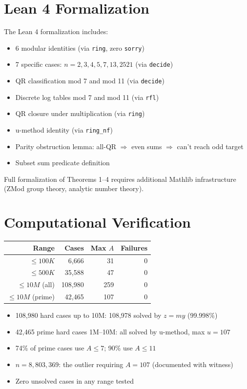 \documentclass[11pt]{article}
\theoremstyle{remark}
\begin{document}
\section{Lean 4 Formalization}

The Lean 4 formalization includes:
\begin{itemize}
\item 6 modular identities (via \texttt{ring}, zero \texttt{sorry})
\item 7 specific cases: $n = 2, 3, 4, 5, 7, 13, 2521$ (via \texttt{decide})
\item QR classification mod 7 and mod 11 (via \texttt{decide})
\item Discrete log tables mod 7 and mod 11 (via \texttt{rfl})
\item QR closure under multiplication (via \texttt{ring})
\item u-method identity (via \texttt{ring\_nf})
\item Parity obstruction lemma: all-QR $\Rightarrow$ even sums $\Rightarrow$ can't reach odd target
\item Subset sum predicate definition
\end{itemize}

Full formalization of Theorems 1--4 requires additional Mathlib infrastructure (ZMod group theory, analytic number theory).

\section{Computational Verification}

\begin{center}
\begin{tabular}{rrrr}
\toprule
Range & Cases & Max $A$ & Failures \\
\midrule
$\leq 100K$ & 6,666 & 31 & 0 \\
$\leq 500K$ & 35,588 & 47 & 0 \\
$\leq 10M$ (all) & 108,980 & 259 & 0 \\
$\leq 10M$ (prime) & 42,465 & 107 & 0 \\
\bottomrule
\end{tabular}
\end{center}

\begin{itemize}
\item 108,980 hard cases up to 10M: 108,978 solved by $z=my$ (99.998\%)
\item 42,465 prime hard cases 1M--10M: all solved by u-method, max $u = 107$
\item 74\% of prime cases use $A \leq 7$; 90\% use $A \leq 11$
\item $n = 8{,}803{,}369$: the outlier requiring $A = 107$ (documented with witness)
\item Zero unsolved cases in any range tested
\end{itemize}
\end{document}
